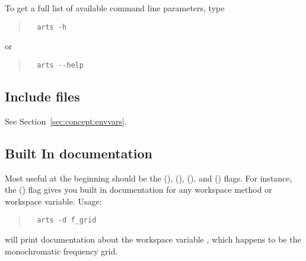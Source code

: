 To get a full list of available command line parameters, type
\begin{quote}
\begin{verbatim}
  arts -h
\end{verbatim}
\end{quote}
or
\begin{quote}
\begin{verbatim}
  arts --help
\end{verbatim}
\end{quote}


\subsection*{Include files}

See Section~\ref{sec:concept:envvars}.


\subsection*{Built In documentation}

Most useful at the beginning should be the 
(),  (), 
(), and  () flags.
For instance, the  () flag gives you built in
documentation for any workspace method or workspace variable. Usage:
\begin{quote}
\begin{verbatim}
  arts -d f_grid
\end{verbatim}
\end{quote}
will print documentation about the workspace variable , which
happens to be the monochromatic frequency grid.

